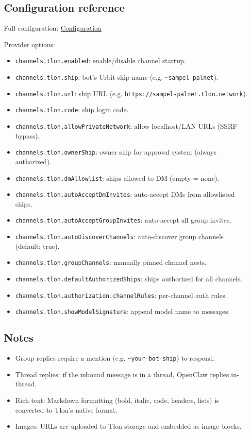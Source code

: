 \subsection{Configuration reference}


Full configuration: \href{/gateway/configuration}{Configuration}

Provider options:

\begin{itemize}
  \item \texttt{channels.tlon.enabled}: enable/disable channel startup.
  \item \texttt{channels.tlon.ship}: bot's Urbit ship name (e.g. \texttt{\textasciitilde{}sampel-palnet}).
  \item \texttt{channels.tlon.url}: ship URL (e.g. \texttt{https://sampel-palnet.tlon.network}).
  \item \texttt{channels.tlon.code}: ship login code.
  \item \texttt{channels.tlon.allowPrivateNetwork}: allow localhost/LAN URLs (SSRF bypass).
  \item \texttt{channels.tlon.ownerShip}: owner ship for approval system (always authorized).
  \item \texttt{channels.tlon.dmAllowlist}: ships allowed to DM (empty = none).
  \item \texttt{channels.tlon.autoAcceptDmInvites}: auto-accept DMs from allowlisted ships.
  \item \texttt{channels.tlon.autoAcceptGroupInvites}: auto-accept all group invites.
  \item \texttt{channels.tlon.autoDiscoverChannels}: auto-discover group channels (default: true).
  \item \texttt{channels.tlon.groupChannels}: manually pinned channel nests.
  \item \texttt{channels.tlon.defaultAuthorizedShips}: ships authorized for all channels.
  \item \texttt{channels.tlon.authorization.channelRules}: per-channel auth rules.
  \item \texttt{channels.tlon.showModelSignature}: append model name to messages.
\end{itemize}


\subsection{Notes}


\begin{itemize}
  \item Group replies require a mention (e.g. \texttt{\textasciitilde{}your-bot-ship}) to respond.
  \item Thread replies: if the inbound message is in a thread, OpenClaw replies in-thread.
  \item Rich text: Markdown formatting (bold, italic, code, headers, lists) is converted to Tlon's native format.
  \item Images: URLs are uploaded to Tlon storage and embedded as image blocks.
\end{itemize}



